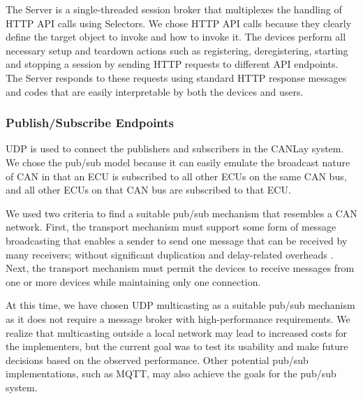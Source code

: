 \documentclass[letterpaper,twocolumn,12pt]{article}
\begin{document}
The Server is a single-threaded session broker that multiplexes the handling of HTTP API calls using Selectors. 
We chose HTTP API calls because they clearly define the target object to invoke and how to invoke it. The devices perform all necessary setup and teardown actions such as registering, deregistering, starting and stopping a session by sending HTTP requests to different API endpoints. 
The Server responds to these requests using standard HTTP response messages and codes that are easily interpretable by both the devices and users.

\subsubsection{Publish/Subscribe Endpoints}
UDP is used to connect the publishers and subscribers in the CANLay system. 
We chose the pub/sub model because it can easily emulate the broadcast nature of CAN \cite{kaiser_implementing_1999} in that an ECU is subscribed to all other ECUs on the same CAN bus, and all other ECUs on that CAN bus are subscribed to that ECU. 

We used two criteria to find a suitable pub/sub mechanism that resembles a CAN network. 
First, the transport mechanism must support some form of message broadcasting that enables a sender to send one message that can be received by many receivers; without significant duplication and delay-related overheads \cite{kaiser_implementing_1999}. 
Next, the transport mechanism must permit the devices to receive messages from one or more devices while maintaining only one connection.

At this time, we have chosen UDP multicasting as a suitable pub/sub mechanism as it does not require a message broker with high-performance requirements. We realize that multicasting outside a local network may lead to increased costs for the implementers, but the current goal was to test its usability and make future decisions based on the observed performance. Other potential pub/sub implementations, such as MQTT, may also achieve the goals for the pub/sub system.
\end{document}
